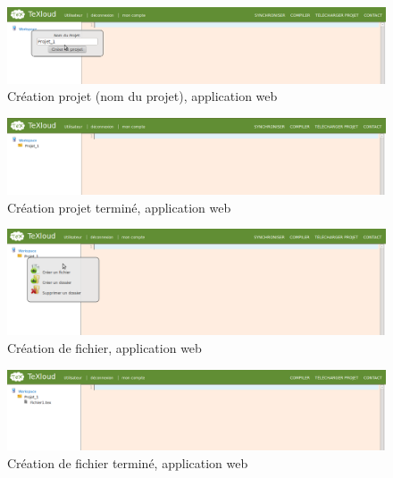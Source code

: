 \documentclass[a4paper,12pt]{article}
\begin{document}
\begin{figure}[!ht]
\begin{center}
  \includegraphics[width=1\textwidth]{./images/screenshot/Suite_Creation_Projet.png}
\end{center}
  \caption{Création projet (nom du projet), application web}
  \label{suiteCreationProjet}
\end{figure}

\begin{figure}[!ht]
\begin{center}
  \includegraphics[width=1\textwidth]{./images/screenshot/Suite2_Creation_Projet.png}
\end{center}
  \caption{Création projet terminé, application web}
  \label{suite2CreationProjet}
\end{figure}


\begin{figure}[!ht]
\begin{center}
  \includegraphics[width=1\textwidth]{./images/screenshot/MenuTextuel.png}
\end{center}
  \caption{Création de fichier, application web}
  \label{creationFichier}
\end{figure}


\begin{figure}[!ht]
\begin{center}
  \includegraphics[width=1\textwidth]{./images/screenshot/Suite_Creation_Fichier.png}
\end{center}
  \caption{Création de fichier terminé, application web}
  \label{creationFichierFin}
\end{figure}
\end{document}
